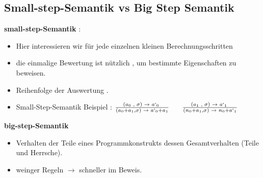 \documentclass[a4paper,12pt,twoside,headsepline]{scrartcl}
\begin{document}
  \subsection{Small-step-Semantik vs Big Step Semantik }  
  \textbf{small-step-Semantik} :
  \begin{itemize}
  	\item Hier interessieren wir für jede einzelnen kleinen Berechnungsschritten
  	\item  die einmalige Bewertung ist nützlich , um bestimmte Eigenschaften zu beweisen.
  	\item Reihenfolge der Auswertung .
  	\item Small-Step-Semantik Beispiel :  $\frac  {\text {($a_0$ , $\sigma$) $\to$ $a`_0$ } } { \text{($a_0$+$a_1$,$\sigma$) $\to$ $a`_0$+$a_1$} }$ $\quad$  $\frac  {\text {($a_1$ , $\sigma$) $\to$ $a`_1$ } } { \text{($n_0$+$a_1$,$\sigma$) $\to$ $n_0$+$a`_1$} }$
  \end{itemize}
  
  
  
  \textbf{big-step-Semantik}
\begin{itemize}
	\item Verhalten der Teile eines Programmkonstrukts dessen Gesamtverhalten (Teile und Herrsche).
	\item weinger Regeln $\rightarrow$ schneller im Beweis.
\end{itemize}
  
  


\nocite{*} 


\end{document}

